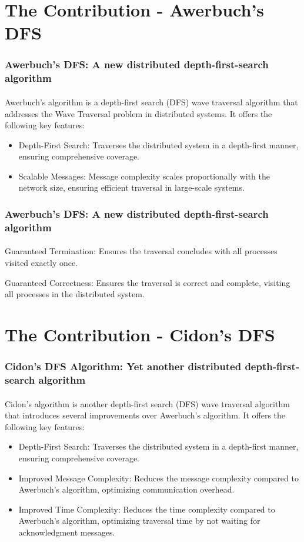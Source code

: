 \documentclass[11pt]{beamer}              %
\begin{document}
\section{The Contribution - Awerbuch's DFS}
\begin{frame}
\frametitle{Awerbuch's DFS: A new distributed depth-first-search algorithm}
\framesubtitle{}
Awerbuch's algorithm is a depth-first search (DFS) wave traversal algorithm that addresses the Wave Traversal problem in distributed systems. It offers the following key features:
\begin{itemize}
\item Depth-First Search: Traverses the distributed system in a depth-first manner, ensuring comprehensive coverage.
\item Scalable Messages: Message complexity scales proportionally with the network size, ensuring efficient traversal in large-scale systems.
\end{itemize}
\end{frame}

\begin{frame}
\frametitle{Awerbuch's DFS: A new distributed depth-first-search algorithm}
\framesubtitle{}
\item Guaranteed Termination: Ensures the traversal concludes with all processes visited exactly once.
\item Guaranteed Correctness: Ensures the traversal is correct and complete, visiting all processes in the distributed system.
\end{frame}

\section{The Contribution - Cidon's DFS}
\begin{frame}
\frametitle{Cidon's DFS Algorithm: Yet another distributed depth-first-search algorithm}
\framesubtitle{}
Cidon's algorithm is another depth-first search (DFS) wave traversal algorithm that introduces several improvements over Awerbuch's algorithm. It offers the following key features:
\begin{itemize}
\item Depth-First Search: Traverses the distributed system in a depth-first manner, ensuring comprehensive coverage.
\item Improved Message Complexity: Reduces the message complexity compared to Awerbuch's algorithm, optimizing communication overhead.
\item Improved Time Complexity: Reduces the time complexity compared to Awerbuch's algorithm, optimizing traversal time by not waiting for acknowledgment messages.
\end{itemize}
\end{frame}
\end{document}
